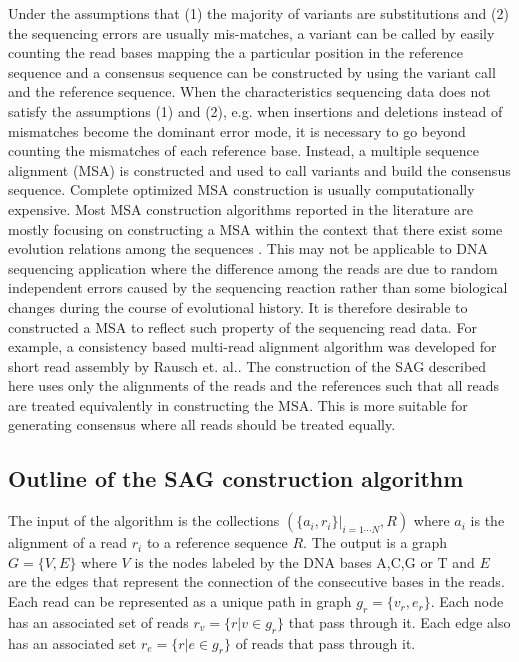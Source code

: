 \documentclass[11pt]{article}
\begin{document}
Under the assumptions that (1) the majority of variants are substitutions and (2) the sequencing errors are usually mis-matches, a variant can be called by easily counting the read bases mapping the a particular position in the reference sequence and a consensus sequence can be constructed by using the variant call and the reference sequence. When the characteristics sequencing data does not satisfy the assumptions (1) and (2), e.g. when insertions and deletions instead of mismatches become the dominant error mode, it is necessary to go beyond counting the mismatches of each reference base. Instead, a multiple sequence alignment (MSA) is constructed and used to call variants and build the consensus sequence. Complete optimized MSA construction is usually computationally expensive. Most MSA construction algorithms reported in the literature are mostly focusing on constructing a MSA within the context that there exist some evolution relations among the sequences \cite{Edgar01032004}\cite{Larkin01112007}.  This may not be applicable to DNA sequencing application where the difference among the reads are due to random independent errors caused by the sequencing reaction rather than some biological changes during the course of evolutional history.  It is therefore desirable to constructed a MSA to reflect such property of the sequencing read data. For example, a consistency based multi-read alignment algorithm was developed for short read assembly by Rausch et. al.\cite{Rausch01052009}. The construction of the SAG described here uses only the alignments of the reads and the references such that all reads are treated equivalently in constructing the MSA. This is more suitable for generating consensus where all reads should be treated equally.

\subsection{Outline of the SAG construction algorithm}

The input of the algorithm is the collections $(\{a_i, r_i\}|_{i=1\cdots N}, R)$ where $a_i$ is the alignment of a read $r_i$ to a reference sequence $R$.  The output is a graph $G=\{V,E\}$ where $V$ is the nodes labeled by the DNA bases A,C,G or T and $E$ are the edges that represent the connection of the consecutive bases in the reads.  Each read can be represented as a unique path in graph $g_r=\{v_r, e_r\}$.  Each node has an associated set of reads $r_v=\{r|v \in g_r\} $ that pass through it. Each edge also has an associated set $r_e=\{r|e \in g_r\}$ of reads that pass through it.
\end{document}
